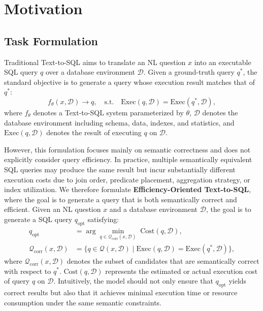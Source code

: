 \vspace{-2mm}
\section{Motivation}
\label{sec:preliminaries}
\begingroup
\setlength{\abovedisplayskip}{3pt}
\setlength{\belowdisplayskip}{3pt}
\setlength{\abovedisplayshortskip}{2pt}
\setlength{\belowdisplayshortskip}{2pt}
\setlength{\jot}{2pt}

\subsection{Task Formulation}
Traditional Text-to-SQL aims to translate an NL question $x$ into an executable SQL query $q$ over a database environment $\mathcal{D}$.
Given a ground-truth query $q^*$, the standard objective is to generate a query whose execution result matches that of $q^*$:
\[
f_\theta(x, \mathcal{D}) \rightarrow q,
\quad
\text{s.t.} \quad
\text{Exec}(q, \mathcal{D}) = \text{Exec}(q^*, \mathcal{D}),
\]
where $f_\theta$ denotes a Text-to-SQL system parameterized by $\theta$, $\mathcal{D}$ denotes the database environment including schema, data, indexes, and statistics, and $\text{Exec}(q, \mathcal{D})$ denotes the result of executing $q$ on $\mathcal{D}$.

However, this formulation focuses mainly on semantic correctness and does not explicitly consider query efficiency.
In practice, multiple semantically equivalent SQL queries may produce the same result but incur substantially different execution costs due to join order, predicate placement, aggregation strategy, or index utilization.
We therefore formulate \textbf{Efficiency-Oriented Text-to-SQL}, where the goal is to generate a query that is both semantically correct and efficient.
Given an NL question $x$ and a database environment $\mathcal{D}$, the goal is to generate a SQL query $q_{\text{opt}}$ satisfying:
\[
\begin{aligned}
	q_{\mathrm{opt}}
	&= \arg\min_{q \in \mathcal{Q}_{\mathrm{corr}}(x,\mathcal{D})}
	\; \text{Cost}(q,\mathcal{D}), \\
	\mathcal{Q}_{\mathrm{corr}}(x,\mathcal{D})
	&= \{q \in \mathcal{Q}(x,\mathcal{D}) \mid \text{Exec}(q,\mathcal{D}) = \text{Exec}(q^*,\mathcal{D})\},
\end{aligned}
\]
where $\mathcal{Q}_{\mathrm{corr}}(x,\mathcal{D})$ denotes the subset of candidates that are semantically correct with respect to $q^*$.
$\text{Cost}(q, \mathcal{D})$ represents the estimated or actual execution cost of query $q$ on $\mathcal{D}$.
Intuitively, the model should not only ensure that $q_{\text{opt}}$ yields correct results but also that it achieves minimal execution time or resource consumption under the same semantic constraints. 

